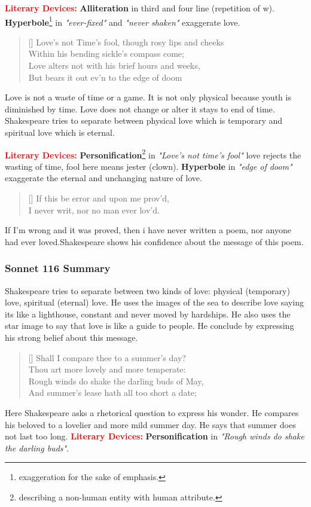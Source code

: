 \documentclass[12pt, a4paper]{article}
\begin{document}
\textbf{\textcolor{red}{Literary Devices:}} \textbf{Alliteration} in third and
four line (repetition of w). \textbf{Hyperbole}\footnote{exaggeration for the sake of emphasis.}
in \textit{"ever-fixed"} and \textit{"never shaken"} 
exaggerate love.

\begin{verse}[\versewidth]
{\fontverse
Love's not Time's fool, though rosy lips and cheeks\\
Within his bending sickle's compass come; \\
Love alters not with his brief hours and weeks,\\
But bears it out ev'n to the edge of doom
}
\end{verse}
Love is not a waste of time or a game. It is not only physical
because youth is diminished by time. Love does not change or alter
it stays to end of time. Shakespeare tries to separate between physical
love which is temporary and spiritual love which is eternal.\medbreak


\textbf{\textcolor{red}{Literary Devices:}} \textbf{Personification}\footnote{
describing a non-human entity with human attribute.} 
in \textit{"Love's not time's fool"} love rejects the wasting of time, fool here means 
jester (clown). \textbf{Hyperbole} in \textit{"edge of doom"} 
exaggerate the eternal and unchanging nature of love.

\begin{verse}[\versewidth]
{\fontverse
If this be error and upon me prov'd,\\
I never writ, nor no man ever lov'd.
}
\end{verse}
If I'm wrong and it was proved, then i have 
never written a poem, nor anyone had ever loved.Shakespeare shows his 
confidence about the message of this poem.

\subsubsection*{Sonnet 116 Summary}
Shakespeare tries to separate between two kinds of love:
physical (temporary) love, spiritual
(eternal) love. He uses the images of the sea to describe love
saying its like a lighthouse, constant and never moved by hardships.
He also uses the star image to say that love is like a guide to people.
He conclude by expressing his strong belief about this message.

\settowidth{\versewidth}{Shall I compare thee to a summer’s day?}
\begin{verse}[\versewidth]
{\fontverse
Shall I compare thee to a summer’s day?\\
Thou art more lovely and more temperate: \\
Rough winds do shake the darling buds of May, \\
And summer’s lease hath all too short a date; 
}
\end{verse}
Here Shakespeare asks a rhetorical question to 
express his wonder. He compares his beloved to a lovelier and
more mild summer day. He says that summer does not last too long.\medbreak
\textbf{\textcolor{red}{Literary Devices:}} \textbf{Personification} in \textit{"Rough winds do shake the darling buds"}.
\end{document}

